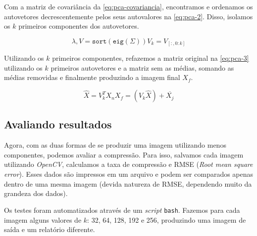 \documentclass[brazilian,a4paper,twocolumn]{article}
\begin{document}
        Com a matriz de covariância da \cref{eq:pca-covariancia}, encontramos e ordenamos os autovetores decrescentemente pelos seus autovalores na \cref{eq:pca-2}. Disso, isolamos os $k$ primeiros componentes dos autovetores.

        \begin{subequations}
            \label{eq:pca-2}
            \begin{equation}
                \label{eq:pca-autovalorvetor}
                \lambda, V = \texttt{sort}(\texttt{eig}(\Sigma))
            \end{equation}
            \begin{equation}
                \label{eq:pca-autovetor-k}
                V_k = V_{[:, 0:k]}
            \end{equation}
        \end{subequations}

        Utilizando os $k$ primeiros componentes, refazemos a matriz original na \cref{eq:pca-3} utilizando os $k$ primeiros autovetores e a matriz sem as médias, somando as médias removidas e finalmente produzindo a imagem final $X_f$.

        \begin{subequations}
            \label{eq:pca-3}
            \begin{equation}
                \label{eq:pca-saida}
                \hat{X} = V^T_k X_n
            \end{equation}
            \begin{equation}
                \label{eq:pca-recomposicao}
                X_f = (V_k \hat{X}) + \overline{X_j}
            \end{equation}
        \end{subequations}


    \subsection{Avaliando resultados}

        Agora, com as duas formas de se produzir uma imagem utilizando menos componentes, podemos avaliar a compressão. Para isso, salvamos cada imagem utilizando \emph{OpenCV}, calculamos a taxa de compressão e RMSE (\textit{Root mean square error}). Esses dados são impressos em um arquivo e podem ser comparados apenas dentro de uma mesma imagem (devida natureza de RMSE, dependendo muito da grandeza dos dados).

        Os testes foram automatizados através de um \textit{script} \texttt{bash}. Fazemos para cada imagem alguns valores de $k$: 32, 64, 128, 192 e 256, produzindo uma imagem de saída e um relatório diferente.
\end{document}
